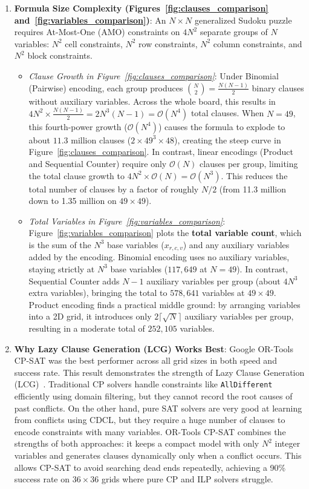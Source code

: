 \documentclass[a4paper,fleqn]{cas-sc}
\begin{document}
\begin{enumerate}
    \item \textbf{Formula Size Complexity (Figures~\ref{fig:clauses_comparison} and~\ref{fig:variables_comparison})}: An $N \times N$ generalized Sudoku puzzle requires At-Most-One (AMO) constraints on $4N^2$ separate groups of $N$ variables: $N^2$ cell constraints, $N^2$ row constraints, $N^2$ column constraints, and $N^2$ block constraints.
    \begin{itemize}
        \item \textit{Clause Growth in Figure~\ref{fig:clauses_comparison}}: Under Binomial (Pairwise) encoding, each group produces $\binom{N}{2} = \frac{N(N-1)}{2}$ binary clauses without auxiliary variables. Across the whole board, this results in $4N^2 \times \frac{N(N-1)}{2} = 2N^3(N-1) = \mathcal{O}(N^4)$ total clauses. When $N = 49$, this fourth-power growth ($\mathcal{O}(N^4)$) causes the formula to explode to about $11.3$ million clauses ($2 \times 49^3 \times 48$), creating the steep curve in Figure~\ref{fig:clauses_comparison}. In contrast, linear encodings (Product and Sequential Counter) require only $\mathcal{O}(N)$ clauses per group, limiting the total clause growth to $4N^2 \times \mathcal{O}(N) = \mathcal{O}(N^3)$. This reduces the total number of clauses by a factor of roughly $N/2$ (from 11.3 million down to 1.35 million on $49 \times 49$).
        \item \textit{Total Variables in Figure~\ref{fig:variables_comparison}}: Figure~\ref{fig:variables_comparison} plots the \textbf{total variable count}, which is the sum of the $N^3$ base variables ($x_{r, c, v}$) and any auxiliary variables added by the encoding. Binomial encoding uses no auxiliary variables, staying strictly at $N^3$ base variables ($117,649$ at $N = 49$). In contrast, Sequential Counter adds $N - 1$ auxiliary variables per group (about $4N^3$ extra variables), bringing the total to $578,641$ variables at $49 \times 49$. Product encoding finds a practical middle ground: by arranging variables into a 2D grid, it introduces only $2\lceil\sqrt{N}\rceil$ auxiliary variables per group, resulting in a moderate total of $252,105$ variables.
    \end{itemize}

    \item \textbf{Why Lazy Clause Generation (LCG) Works Best}: Google OR-Tools CP-SAT was the best performer across all grid sizes in both speed and success rate. This result demonstrates the strength of Lazy Clause Generation (LCG)~\cite{feydy2009lazy}. Traditional CP solvers handle constraints like \texttt{AllDifferent} efficiently using domain filtering, but they cannot record the root causes of past conflicts. On the other hand, pure SAT solvers are very good at learning from conflicts using CDCL, but they require a huge number of clauses to encode constraints with many variables. OR-Tools CP-SAT combines the strengths of both approaches: it keeps a compact model with only $N^2$ integer variables and generates clauses dynamically only when a conflict occurs. This allows CP-SAT to avoid searching dead ends repeatedly, achieving a 90\% success rate on $36 \times 36$ grids where pure CP and ILP solvers struggle.
    

\end{enumerate}
\end{document}
